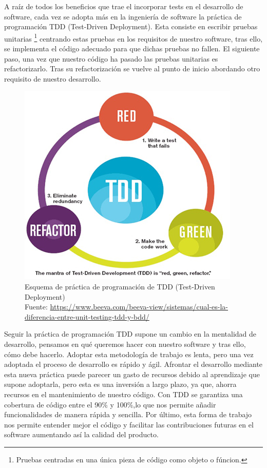 A raíz de todos los beneficios que trae el incorporar tests en el desarrollo de software, cada vez se adopta más en la ingeniería de software la práctica de programación TDD (Test-Driven Deployment). Esta consiste en escribir pruebas unitarias \footnote{Pruebas centradas en una única pieza de código como objeto o fúncion.} centrando estas pruebas en los requisitos de nuestro software, tras ello, se implementa el código adecuado para que dichas pruebas no fallen. El siguiente paso, una vez que nuestro código ha pasado las pruebas unitarias es refactorizarlo. Tras su refactorización se vuelve al punto de inicio abordando otro requisito de nuestro desarrollo. \\
\begin{figure}[H]
    \centering
    \includegraphics[scale=0.8]{img/TDD__logo.jpg}
    \caption{Esquema de práctica de programación de TDD (Test-Driven Deployment)\\ Fuente: \url{https://www.beeva.com/beeva-view/sistemas/cual-es-la-diferencia-entre-unit-testing-tdd-y-bdd/}}
    \label{fig:tdd}
\end{figure}
Seguir la práctica de programación TDD supone un cambio en la mentalidad de desarrollo, pensamos en qué queremos hacer con nuestro software y tras ello, cómo debe hacerlo. Adoptar esta metodología de trabajo es lenta, pero una vez adoptada el proceso de desarrollo es rápido y ágil. Afrontar el desarrollo mediante esta nueva práctica puede parecer un gasto de recursos debido al aprendizaje que supone adoptarla, pero esta es una inversión a largo plazo, ya que, ahorra recursos en el mantenimiento de nuestro código. Con TDD se garantiza una cobertura de código entre el 90\% y 100\%,lo que nos permite añadir funcionalidades de manera rápida y sencilla. Por último, esta forma de trabajo nos permite entender mejor el código y facilitar las contribuciones futuras en el software aumentando así la calidad del producto. 
